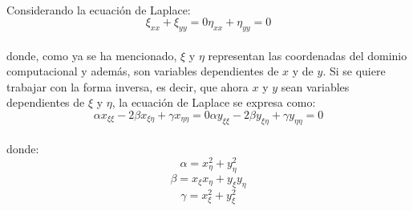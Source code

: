 \documentclass[letterpaper, openright, 12pt]{book}
\begin{document}
    \paragraph*{}
    Considerando la ecuación de Laplace:
    \begin{subequations}
        \begin{equation}
            \xi_{xx} + \xi_{yy} = 0
        \end{equation}
        \begin{equation}
            \eta_{xx} + \eta_{yy} = 0
        \end{equation}
        \label{ec-laplace}
    \end{subequations}\\
    donde, como ya se ha mencionado, $\xi$ y $\eta$ representan las
    coordenadas del dominio computacional y además, son variables
    dependientes de $x$ y de $y$. Si se quiere trabajar con la forma
    inversa, es decir, que ahora $x$ y $y$ sean variables dependientes de
    $\xi$ y $\eta$, la ecuación  de Laplace se expresa como:
    \begin{subequations}
        \begin{equation}
            \alpha x_{\xi \xi} - 2\beta x_{\xi \eta} + \gamma x_{\eta \eta} = 0
        \end{equation}
        \begin{equation}
            \alpha y_{\xi \xi} - 2\beta y_{\xi \eta} + \gamma y_{\eta \eta} = 0
        \end{equation}
        \label{ec-laplace-invertida}
    \end{subequations}\\

    donde:
    \begin{equation*}
        \alpha = x_{\eta} ^ 2 + y_{\eta}^2
    \end{equation*}
    \begin{equation*}
        \beta = x_{\xi} x_{\eta} + y_{\xi} y_{\eta}
    \end{equation*}
    \begin{equation*}
        \gamma = x_{\xi} ^ 2 + y_{\xi} ^ 2
    \end{equation*}
\end{document}
